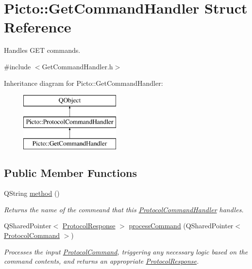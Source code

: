 \hypertarget{struct_picto_1_1_get_command_handler}{\section{Picto\-:\-:Get\-Command\-Handler Struct Reference}
\label{struct_picto_1_1_get_command_handler}
}


Handles G\-E\-T commands.  




{\ttfamily \#include $<$Get\-Command\-Handler.\-h$>$}

Inheritance diagram for Picto\-:\-:Get\-Command\-Handler\-:\begin{figure}[H]
\begin{center}
\leavevmode
\includegraphics[height=3.000000cm]{struct_picto_1_1_get_command_handler}
\end{center}
\end{figure}
\subsection*{Public Member Functions}
\begin{DoxyCompactItemize}
\item 
\hypertarget{struct_picto_1_1_get_command_handler_a6282b0e0b417324bc82b8356129a5806}{Q\-String \hyperlink{struct_picto_1_1_get_command_handler_a6282b0e0b417324bc82b8356129a5806}{method} ()}\label{struct_picto_1_1_get_command_handler_a6282b0e0b417324bc82b8356129a5806}

\begin{DoxyCompactList}\small\item\em Returns the name of the commeand that this \hyperlink{struct_picto_1_1_protocol_command_handler}{Protocol\-Command\-Handler} handles. \end{DoxyCompactList}\item 
\hypertarget{struct_picto_1_1_get_command_handler_ab9745da8713315759ccbf5d4d31acb28}{Q\-Shared\-Pointer$<$ \hyperlink{struct_picto_1_1_protocol_response}{Protocol\-Response} $>$ \hyperlink{struct_picto_1_1_get_command_handler_ab9745da8713315759ccbf5d4d31acb28}{process\-Command} (Q\-Shared\-Pointer$<$ \hyperlink{struct_picto_1_1_protocol_command}{Protocol\-Command} $>$)}\label{struct_picto_1_1_get_command_handler_ab9745da8713315759ccbf5d4d31acb28}

\begin{DoxyCompactList}\small\item\em Processes the input \hyperlink{struct_picto_1_1_protocol_command}{Protocol\-Command}, triggering any necessary logic based on the command contents, and returns an appropriate \hyperlink{struct_picto_1_1_protocol_response}{Protocol\-Response}. \end{DoxyCompactList}\end{DoxyCompactItemize}


